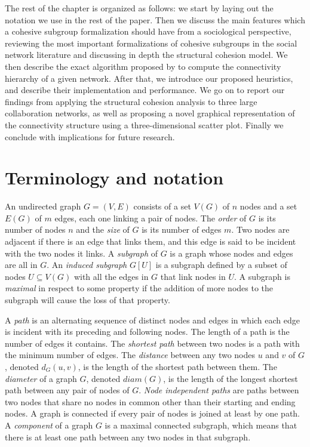 The rest of the chapter is organized as follows: we start by laying out the notation we use in the rest of the paper. Then we discuss the main features which a cohesive subgroup formalization should have from a sociological perspective, reviewing the most important formalizations of cohesive subgroups in the social network literature and discussing in depth the structural cohesion model. We then describe the exact algorithm proposed by \citet{moody:2003} to compute the connectivity hierarchy of a given network. After that, we introduce our proposed heuristics, and describe their implementation and performance. We go on to report our findings from applying the structural cohesion analysis to three large collaboration networks, as well as proposing a novel graphical representation of the connectivity structure using a three-dimensional scatter plot. Finally we conclude with implications for future research.

\section{Terminology and notation}

An undirected graph $G=(V,E)$ consists of a set $V(G)$ of $n$ nodes and a set $E(G)$ of $m$ edges, each one linking a pair of nodes. The \emph{order} of $G$ is its number of nodes $n$ and the \emph{size} of $G$ is its number of edges $m$. Two nodes are adjacent if there is an edge that links them, and this edge is said to be incident with the two nodes it links. A \emph{subgraph} of $G$ is a graph whose nodes and edges are all in $G$. An \emph{induced subgraph} $G[U]$ is a subgraph defined by a subset of nodes $U \subseteq V(G)$ with all the edges in $G$ that link nodes in $U$. A subgraph is \emph{maximal} in respect to some property if the addition of more nodes to the subgraph will cause the loss of that property.

A \emph{path} is an alternating sequence of distinct nodes and edges in which each edge is incident with its preceding and following nodes. The length of a path is the number of edges it contains. The \emph{shortest path} between two nodes is a path with the minimum number of edges. The \emph{distance} between any two nodes $u$ and $v$ of $G$, denoted $d_{G}(u,v)$, is the length of the shortest path between them. The \emph{diameter} of a graph $G$, denoted $diam(G)$, is the length of the longest shortest path between any pair of nodes of $G$. \emph{Node independent paths} are paths between two nodes that share no nodes in common other than their starting and ending nodes. A graph is connected if every pair of nodes is joined at least by one path. A \emph{component} of a graph $G$ is a maximal connected subgraph, which means that there is at least one path between any two nodes in that subgraph.

